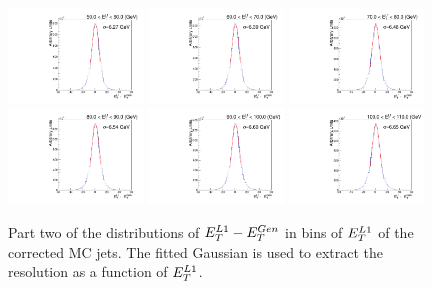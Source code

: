 \begin{figure}[h!]
    \centering
          \includegraphics[width=0.32\textwidth]{detector/l1jet/gaussfits//ptBin_7_PtAll_pf.pdf}
          \includegraphics[width=0.32\textwidth]{detector/l1jet/gaussfits//ptBin_8_PtAll_pf.pdf}
          \includegraphics[width=0.32\textwidth]{detector/l1jet/gaussfits//ptBin_9_PtAll_pf.pdf}\\
          \includegraphics[width=0.32\textwidth]{detector/l1jet/gaussfits//ptBin_10_PtAll_pf.pdf}
          \includegraphics[width=0.32\textwidth]{detector/l1jet/gaussfits//ptBin_11_PtAll_pf.pdf}
          \includegraphics[width=0.32\textwidth]{detector/l1jet/gaussfits//ptBin_12_PtAll_pf.pdf}
    \caption{Part two of the distributions of $E_{T}^{L1}-E_{T}^{Gen}$ in bins of $E_{T}^{L1}$ of the corrected MC jets. 
	The fitted Gaussian is used to extract the resolution as a function of $E_{T}^{L1}$.}
    \label{fig:mcresfits_pf_p2}
\end{figure}


